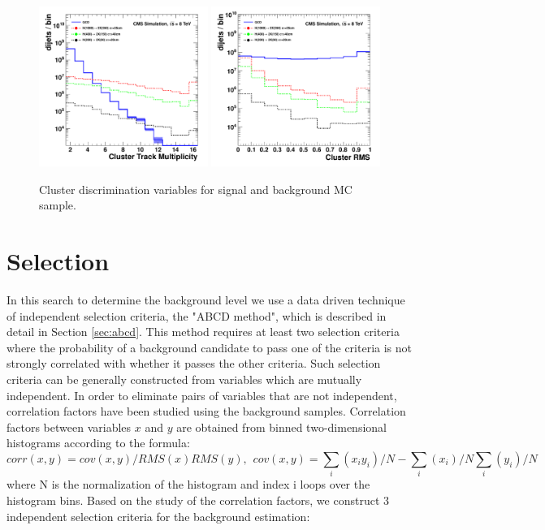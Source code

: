 \begin{enumerate}
\begin{figure}
\centering
\includegraphics[width=0.49\textwidth]{plots/discrimination/disc_clrN.pdf}
\includegraphics[width=0.49\textwidth]{plots/discrimination/disc_clrRMS.pdf}
\caption{Cluster discrimination variables for signal and background MC sample. \label{fig:discclr}}

\end{figure}


\end{enumerate}

\section{Selection}
\label{sec:selection}

In this search  
to determine the background level we use a data driven technique
of independent selection criteria, the "ABCD method", which is
 described in detail in Section \ref{sec:abcd}. This method requires
at least two selection criteria where the probability of a background candidate to pass one of the criteria is
not strongly correlated with whether it passes the other criteria. Such selection criteria can be generally
constructed
from variables which are mutually independent. 
 In order to eliminate pairs of variables that are not independent,
 correlation factors have been studied using the background samples.  
Correlation factors between variables $x$ and $y$ are obtained from binned two-dimensional histograms 
according to the formula:
\begin{equation}
 corr(x,y) = cov(x,y)/RMS(x)RMS(y), \hspace{5pt} cov(x,y)= \sum_i(x_i y_i)/N - \sum_i(x_i)/N \sum_i(y_i)/N
\label{eqn:corr}
\end{equation}
where N is the normalization of the histogram and index i loops over the histogram bins. Based on the study of the correlation factors, we construct
3 independent selection criteria for the background estimation:

